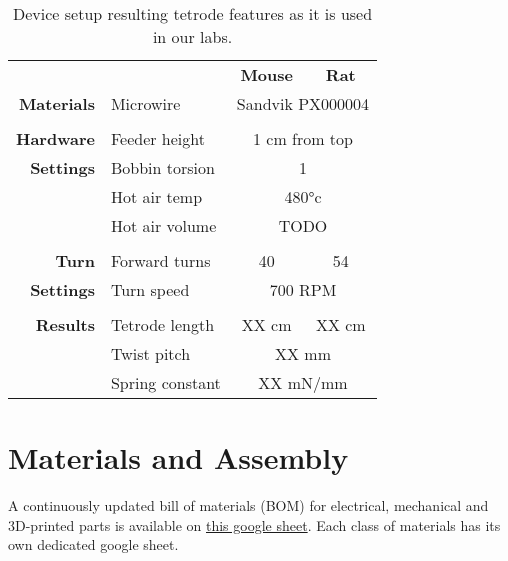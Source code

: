 \documentclass[11pt,a4paper]{article}
\begin{document}
\begin{table}[!htbp]
\centering
\caption{Device setup resulting tetrode features as it is used in our labs.}
\label{t:tetrode-param}

\begin{tabular}{rlcc}
\toprule
&
&
\textbf{Mouse} &
\textbf{Rat} \\
\cmidrule{3-4}
\textbf{Materials}  & Microwire          & \multicolumn{2}{c}{Sandvik PX000004} \\
                    &                    & \\
\textbf{Hardware}   & Feeder height      & \multicolumn{2}{c}{1 cm from top} \\
\textbf{Settings}   & Bobbin torsion     & \multicolumn{2}{c}{1} \\
                    & Hot air temp       & \multicolumn{2}{c}{\ang{480}c} \\
                    & Hot air volume     & \multicolumn{2}{c}{TODO} \\
                    &                    & \\
\textbf{Turn}       & Forward turns      & 40  & 54 \\
\textbf{Settings}   & Turn speed         & \multicolumn{2}{c}{700 RPM} \\
                    &                    & \\
\textbf{Results}    & Tetrode length     & XX cm  & XX cm \\
                    & Twist pitch        & \multicolumn{2}{c}{XX mm} \\
                    & Spring constant    & \multicolumn{2}{c}{XX mN/mm} \\
\bottomrule
\end{tabular}
\end{table}


\section{Materials and Assembly}
A continuously updated bill of materials (BOM) for electrical, mechanical and
3D-printed parts is available on
\href{https://docs.google.com/spreadsheets/d/1tdc3wfE6V87q8yqBOQvDj7WylAztkh6_2kuL-YzyB0g/edit#gid=0}{this
google sheet}. Each class of materials has its own dedicated google sheet.
\end{document}
